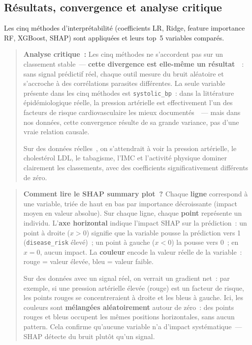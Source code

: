 \subsection{Résultats, convergence et analyse critique}

Les cinq méthodes d'interprétabilité (coefficients LR, Ridge, feature importance RF, XGBoost, SHAP) sont appliquées et leurs top~5 variables comparés.

\begin{quote}
\textbf{Analyse critique~:} Les cinq méthodes ne s'accordent pas sur un classement stable~--- \textbf{cette divergence est elle-même un résultat}~\cite{rudin2019}~: sans signal prédictif réel, chaque outil mesure du bruit aléatoire et s'accroche à des corrélations parasites différentes. La seule variable présente dans les cinq méthodes est \texttt{systolic\_bp}~: dans la littérature épidémiologique réelle, la pression artérielle est effectivement l'un des facteurs de risque cardiovasculaire les mieux documentés~\cite{esc2018}~--- mais dans nos données, cette convergence résulte de sa grande variance, pas d'une vraie relation causale.

Sur des données réelles~\cite{booth2012, who2000}, on s'attendrait à voir la pression artérielle, le cholestérol LDL, le tabagisme, l'IMC et l'activité physique dominer clairement les classements, avec des coefficients significativement différents de zéro.
\end{quote}

\begin{quote}
\textbf{Comment lire le SHAP summary plot~?} Chaque \textbf{ligne} correspond à une variable, triée de haut en bas par importance décroissante (impact moyen en valeur absolue). Sur chaque ligne, chaque \textbf{point} représente un individu. L'\textbf{axe horizontal} indique l'impact SHAP sur la prédiction~: un point à droite ($x > 0$) signifie que la variable pousse la prédiction vers 1 (\texttt{disease\_risk} élevé)~; un point à gauche ($x < 0$) la pousse vers 0~; en $x = 0$, aucun impact. La \textbf{couleur} encode la valeur réelle de la variable~: rouge = valeur élevée, bleu = valeur faible.

Sur des données avec un signal réel, on verrait un gradient net~: par exemple, si une pression artérielle élevée (rouge) est un facteur de risque, les points rouges se concentreraient à droite et les bleus à gauche. Ici, les couleurs sont \textbf{mélangées aléatoirement} autour de zéro~: des points rouges et bleus occupent les mêmes positions horizontales, sans aucun pattern. Cela confirme qu'aucune variable n'a d'impact systématique~--- SHAP détecte du bruit plutôt qu'un signal.
\end{quote}

